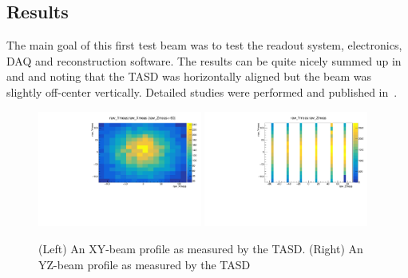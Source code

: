 \subsection{Results}

The main goal of this first test beam was to test the readout system, electronics, DAQ and reconstruction software. The results can be quite nicely summed up in  and  and noting that the TASD was horizontally aligned but the beam was slightly off-center vertically. Detailed studies were performed and published in~\cite{52Georgi}.


\begin{figure}[h!]
\centering
\includegraphics[width=0.48\textwidth]{figures/nuphys/newFigures/beamXYplane1Hadron.pdf}
\includegraphics[width=0.48\textwidth]{figures/nuphys/newFigures/beamYZhadron.pdf}
\caption{(Left) An XY-beam profile as measured by the TASD. (Right) An YZ-beam profile as measured by the TASD}
\label{fig:TASDres2}
\end{figure}

